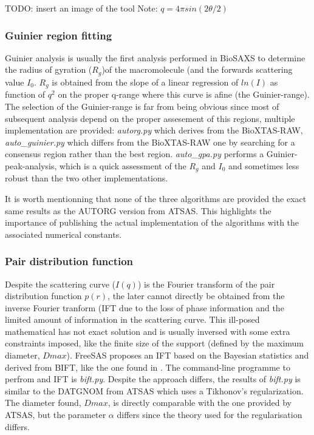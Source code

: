 \documentclass[preprint]{iucr}              %
\begin{document}
TODO: insert an image  of the tool
Note:
$q = 4\pi sin(2\theta/2)$

\subsubsection{Guinier region fitting}
Guinier analysis \cite{guinier} is usually the first analysis performed in BioSAXS to determine the radius of gyration ($R_g$)of the macromolecule (and the forwards scattering value $I_0$.
$R_g$ is obtained from the slope of a linear regression of $ln(I)$ as function of $q^2$ on the proper q-range where this curve is afine (the Guinier-range).
The selection of the Guinier-range is far from being obvious since most of subsequent analysis depend on the proper assesement of this regions, 
multiple implementation are provided: \textit{autorg.py} which derives from the BioXTAS-RAW\cite{BioXTAS}, \textit{auto_guinier.py} which differs from the BioXTAS-RAW
one by searching for a consensus region rather than the best region. 
\textit{auto_gpa.py} performs a Guinier-peak-analysis\cite{gpa}, which is a quick assessment of the $R_g$ and $I_0$ and sometimes less robust than the two other implementations. 

It is worth mentionning that none of the three algorithms are provided the exact same results as the AUTORG\cite{ATSAS2} version from ATSAS. 
This highlights the importance of publishing the actual implementation of the algorithms with the associated numerical constants.
  
\subsubsection{Pair distribution function}
Despite the scattering curve ($I(q)$) is the Fourier transform of the pair distribution function $p(r)$, the later cannot directly be obtained from the
inverse Fourier tranform (IFT due to the loss of phase information and the limited amount of information in the scattering curve. 
This ill-posed mathematical has not exact solution and is usually inversed with some extra constraints imposed, like the finite size of the support (defined by the maximum diameter, $Dmax$).    
FreeSAS proposes an IFT based on the Bayesian statistics and derived from BIFT\cite{bift}, like the one found in \cite{BioXTAS-RAW}.
The command-line programme to perfrom and IFT is \textit{bift.py}. 
Despite the approach differs, the results of \textit{bift.py} is similar to the DATGNOM\cite{ATSAS1} from ATSAS which uses a Tikhonov's regularization.
The diameter found, $Dmax$, is directly comparable with the one provided by ATSAS, but the parameter $\alpha$ differs since the theory used for the regularisation differs. 
\end{document}
